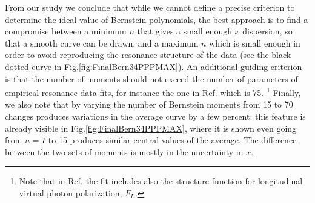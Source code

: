 \documentclass[
twocolumn,
aps,prd,
nofootinbib,
superscriptaddress,
showpacs,ligh
tightenlines, 
]{revtex4}
\begin{document}
From our study we conclude that while we cannot define a precise criterion to determine the ideal value of Bernstein polynomials, the best approach is to find a compromise between a minimum $n$ that gives a small enough $x$ dispersion, so that a smooth curve can be drawn, and a maximum $n$ which is small enough in order to avoid reproducing the resonance structure of the data (see the black dotted curve in Fig.\ref{fig:FinalBern34PPPMAX}). An additional guiding criterion is that the number of moments should not exceed the number of parameters of empirical resonance data fits, for instance the one in Ref.\cite{Christy:2007ve} which is 75. 
\footnote{Note that in Ref.\cite{Christy:2007ve} the fit includes also the structure function for longitudinal virtual photon polarization, $F_L$.}
Finally, we also note that by varying the number of Bernstein moments from 15 to 70 changes produces variations in the average curve by a few percent: this feature is already visible in Fig.\ref{fig:FinalBern34PPPMAX}, where it is shown even going from $n=7$ to 15 produces similar central values of the average. The difference between the two sets of moments is mostly in the uncertainty in $x$.  

\end{document}
